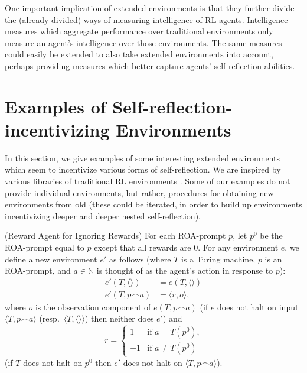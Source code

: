 \documentclass[runningheads]{llncs}
\begin{document}
One important implication of extended environments is that they further divide
the (already divided) ways of measuring intelligence of RL agents. Intelligence
measures
\cite{alexander2019intelligence} \cite{hernandez} \cite{legg2007universal}
which aggregate performance over traditional environments only measure
an agent's intelligence over those environments. The same measures could easily
be extended to also take extended environments into account, perhaps providing
measures which better capture agents' self-reflection abilities.

\section{Examples of Self-reflection-incentivizing Environments}

In this section, we give examples of some interesting extended environments which seem
to incentivize various forms of self-reflection. We are inspired by various libraries of
traditional RL environments \cite{bellemare2013arcade}
\cite{beyret2019animal} \cite{brockman2016openai} \cite{chollet2019measure}
\cite{cobbe2020leveraging}. Some of our examples do not provide individual environments,
but rather, procedures for obtaining new environments from old (these could be iterated,
in order to build up environments incentivizing deeper and deeper nested self-reflection).

\begin{example}
\label{rewardagentforignoringrewardsexample}
    (Reward Agent for Ignoring Rewards)
    For each ROA-prompt $p$, let $p^0$ be the ROA-prompt equal to $p$ except that
    all rewards are $0$.
    For any environment $e$, we define a new environment
    $e'$ as follows
    (where $T$ is a Turing machine, $p$ is an ROA-prompt, and $a\in \mathbb N$ is thought of as
    the agent's action in response to $p$):
    \begin{align*}
        e'(T,\langle\rangle) &= e(T,\langle\rangle)\\
        e'(T,p\frown a)
        &= \langle r,o\rangle,
    \end{align*}
    where $o$ is the observation component of
    $e(T,p\frown a)$ (if $e$ does not halt on input $\langle T,p\frown a\rangle$
    (resp.\ $\langle T,\langle\rangle\rangle$)
    then neither does $e'$) and
    \[
        r =
        \begin{cases}
            1 & \mbox{if $a=T(p^0)$,}\\
            -1 & \mbox{if $a\not=T(p^0)$}
        \end{cases}
    \]
    (if $T$ does not halt on $p^0$ then $e'$ does not halt on
    $\langle T,p\frown a\rangle$).
\end{example}
\end{document}
